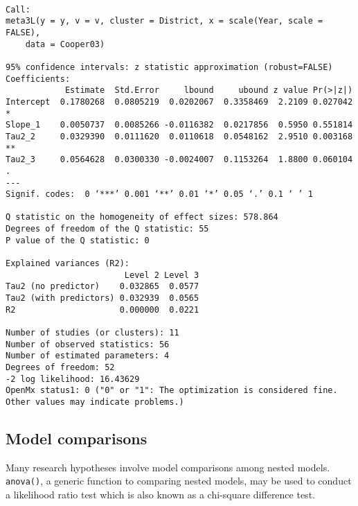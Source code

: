 \documentclass[11pt]{article}
\begin{document}
\begin{enumerate}
\begin{verbatim}

Call:
meta3L(y = y, v = v, cluster = District, x = scale(Year, scale = FALSE), 
    data = Cooper03)

95% confidence intervals: z statistic approximation (robust=FALSE)
Coefficients:
            Estimate  Std.Error     lbound     ubound z value Pr(>|z|)   
Intercept  0.1780268  0.0805219  0.0202067  0.3358469  2.2109 0.027042 * 
Slope_1    0.0050737  0.0085266 -0.0116382  0.0217856  0.5950 0.551814   
Tau2_2     0.0329390  0.0111620  0.0110618  0.0548162  2.9510 0.003168 **
Tau2_3     0.0564628  0.0300330 -0.0024007  0.1153264  1.8800 0.060104 . 
---
Signif. codes:  0 ‘***’ 0.001 ‘**’ 0.01 ‘*’ 0.05 ‘.’ 0.1 ‘ ’ 1

Q statistic on the homogeneity of effect sizes: 578.864
Degrees of freedom of the Q statistic: 55
P value of the Q statistic: 0

Explained variances (R2):
                        Level 2 Level 3
Tau2 (no predictor)    0.032865  0.0577
Tau2 (with predictors) 0.032939  0.0565
R2                     0.000000  0.0221

Number of studies (or clusters): 11
Number of observed statistics: 56
Number of estimated parameters: 4
Degrees of freedom: 52
-2 log likelihood: 16.43629 
OpenMx status1: 0 ("0" or "1": The optimization is considered fine.
Other values may indicate problems.)
\end{verbatim}
\end{enumerate}

\subsection{Model comparisons}
\label{sec:org1dd10d8}
Many research hypotheses involve model comparisons among nested models. \texttt{anova()}, a generic function to comparing nested models, may be used to conduct a likelihood ratio test which is also known as a chi-square difference test.
\end{document}
